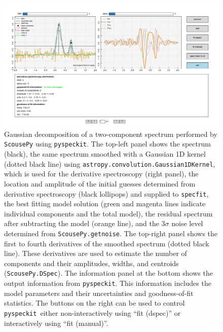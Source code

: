 \documentclass[twocolumn,linenumbers]{aastex63}
\newcommand{\pyspeckit}{\texttt{pyspeckit}\xspace}
\begin{document}
\begin{figure}[!htp]
\includegraphics[scale=1,width=7in]{scousepy.png}
\caption{Gaussian decomposition of a two-component spectrum performed by \texttt{ScousePy} using \pyspeckit. The top-left panel shows the spectrum (black), the same spectrum smoothed with a Gaussian 1D kernel (dotted black line) using \texttt{astropy.convolution.Gaussian1DKernel}, which is used for the derivative spectroscopy (right panel), the location and amplitude of the initial guesses determined from derivative spectroscopy (black lollipops) and supplied to \texttt{specfit}, the best fitting model solution (green and magenta lines indicate individual components and the total model), the residual spectrum after subtracting the model (orange line), and the $3\sigma$ noise level determined from \texttt{ScousePy.getnoise}. The top-right panel shows the first to fourth derivatives of the smoothed spectrum (dotted black line).
These derivatives are used to estimate the number of components and their amplitudes, widths, and centroids (\texttt{ScousePy.DSpec}). The information panel at the bottom shows the output information from \pyspeckit. This information includes the model parameters and their uncertainties and goodness-of-fit statistics. The buttons on the right can be used to control \pyspeckit \ either non-interactively using ``fit (dspec)'' or interactively using ``fit (manual)''. }
\label{fig:scousepydemo}
\end{figure}
\end{document}
